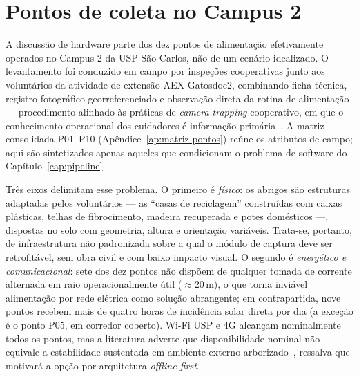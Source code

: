 \section{Pontos de coleta no Campus 2}
\label{sec:caracterizacao-pontos}

A discussão de hardware parte dos dez pontos de alimentação efetivamente operados no Campus 2 da USP São Carlos, não de um cenário idealizado. O levantamento foi conduzido em campo por inspeções cooperativas junto aos voluntários da atividade de extensão AEX Gatosdoc2, combinando ficha técnica, registro fotográfico georreferenciado e observação direta da rotina de alimentação --- procedimento alinhado às práticas de \emph{camera trapping} cooperativo, em que o conhecimento operacional dos cuidadores é informação primária~\cite{velez2022choosing,cordier2022africa}. A matriz consolidada P01--P10 (Apêndice~\ref{ap:matriz-pontos}) reúne os atributos de campo; aqui são sintetizados apenas aqueles que condicionam o problema de software do Capítulo~\ref{cap:pipeline}.

Três eixos delimitam esse problema. O primeiro é \emph{físico}: os abrigos são estruturas adaptadas pelos voluntários --- as ``casas de reciclagem'' construídas com caixas plásticas, telhas de fibrocimento, madeira recuperada e potes domésticos ---, dispostas no solo com geometria, altura e orientação variáveis. Trata-se, portanto, de infraestrutura não padronizada sobre a qual o módulo de captura deve ser retrofitável, sem obra civil e com baixo impacto visual. O segundo é \emph{energético e comunicacional}: sete dos dez pontos não dispõem de qualquer tomada de corrente alternada em raio operacionalmente útil ($\approx 20$\,m), o que torna inviável alimentação por rede elétrica como solução abrangente; em contrapartida, nove pontos recebem mais de quatro horas de incidência solar direta por dia (a exceção é o ponto P05, em corredor coberto). Wi-Fi USP e 4G alcançam nominalmente todos os pontos, mas a literatura adverte que disponibilidade nominal não equivale a estabilidade sustentada em ambiente externo arborizado~\cite{bruce2025largescale,velez2022choosing}, ressalva que motivará a opção por arquitetura \emph{offline-first}.

